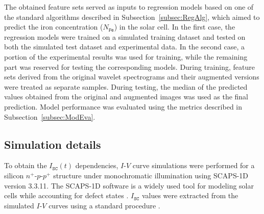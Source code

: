 \documentclass[10pt]{iopart}
\begin{document}
The obtained feature sets served as inputs to regression models based on one of the standard algorithms described in Subsection~\ref{subsec:RegAlg},
which aimed to predict the iron concentration ($N_\mathtt{Fe}$) in the solar cell.
In the first case, the regression models were trained on a simulated training dataset and tested on both the simulated test dataset and experimental data.
In the second case, a portion of the experimental results was used for training, while the remaining part was reserved for testing the corresponding models.
During training, feature sets derived from the original wavelet spectrograms and their augmented versions were treated as separate samples.
During testing, the median of the predicted values obtained from the original and augmented images was used as the final prediction.
Model performance was evaluated using the metrics described in Subsection~\ref{subsec:ModEva}.


\subsection{Simulation details}\label{subsec:SimDet}

To obtain the $I_\mathtt{SC}(t)$ dependencies, $I$-$V$ curve simulations were performed for a silicon $n^+$-$p$-$p^+$ structure
under monochromatic illumination using SCAPS-1D version 3.3.11.
The SCAPS-1D software \cite{SCAPS1} is a widely used tool for modeling solar cells 
while accounting for defect states \cite{MasumMia2025, Joshi2024, Ravidas2024, Liu2024, You2023, SCAPSDefect3}.
$I_\mathtt{SC}$ values were extracted from the simulated $I$-$V$ curves using a standard procedure \cite{SCparam2017}.
\end{document}
